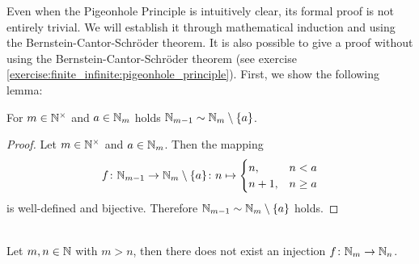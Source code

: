 Even when the Pigeonhole Principle is intuitively clear, its formal proof is not entirely trivial. We will establish it through mathematical induction and using the Bernstein-Cantor-Schröder theorem. It is also possible to give a proof without using the Bernstein-Cantor-Schröder theorem (see exercise \ref{exercise:finite_infinite:pigeonhole_principle}). First, we show the following lemma:

\begin{lemma}\label{lemma:finite_infinite:pigeonhole_principle} For $m\in\mathbb{N}^\times$ and $a\in\mathbb{N}_m$ holds $\mathbb{N}_{m-1}\sim\mathbb{N}_m\setminus\{a\}$.\end{lemma}

\begin{proof}
    Let $m\in\mathbb{N}^\times$ and $a\in\mathbb{N}_m$. Then the mapping
    \begin{align}
        f\colon \mathbb{N}_{m-1}\to\mathbb{N}_m\setminus\{a\}\colon n\mapsto\begin{cases}n,& n<a\\ n+1,&n\geq a\end{cases}
    \end{align}
    is well-defined and bijective. Therefore $\mathbb{N}_{m-1}\sim\mathbb{N}_m\setminus\{a\}$ holds.
\end{proof}

\begin{theorem}\label{theorem:finite_infinite:pigeonhole_principle}~\\
    Let $m,n\in\mathbb{N}$ with $m>n$, then there does not exist an injection $f\colon \mathbb{N}_m\rightarrow\mathbb{N}_n$.
\end{theorem}

